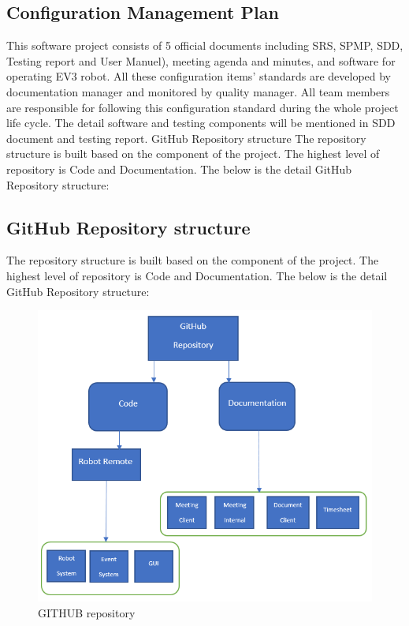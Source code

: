\subsection{Configuration Management Plan}
This software project consists of 5 official documents including SRS, SPMP, SDD, Testing report and User Manuel), meeting agenda and minutes, and software for operating EV3 robot. All these configuration items’ standards are developed by documentation manager and monitored by quality manager. All team members are responsible for following this configuration standard during the whole project life cycle. The detail software and testing components will be mentioned in SDD document and testing report.
GitHub Repository structure
The repository structure is built based on the component of the project. The highest level of repository is Code and Documentation. The below is the detail GitHub Repository structure:

\subsection{GitHub Repository structure}
The repository structure is built based on the component of the project. The highest level of repository is Code and Documentation. The below is the detail GitHub Repository structure:

\begin{figure}[H]
	\includegraphics[width=\linewidth]{GIT.png}  %
	\caption{GITHUB repository}
	\label{fig:GITHUB repository}				
\end{figure}


